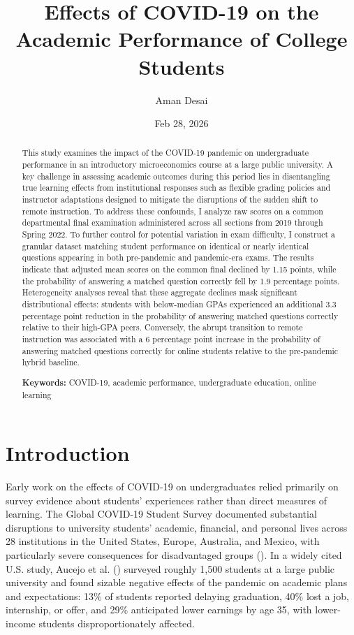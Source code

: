 \documentclass[
  12pt,
  letterpaper,
  DIV=11,
  numbers=noendperiod]{scrartcl}
\title{Effects of COVID-19 on the Academic Performance of College
Students}
\author{Aman Desai}
\date{Feb 28, 2026}
\begin{document}
\maketitle
\begin{abstract}
This study examines the impact of the COVID-19 pandemic on undergraduate
performance in an introductory microeconomics course at a large public
university. A key challenge in assessing academic outcomes during this
period lies in disentangling true learning effects from institutional
responses such as flexible grading policies and instructor adaptations
designed to mitigate the disruptions of the sudden shift to remote
instruction. To address these confounds, I analyze raw scores on a
common departmental final examination administered across all sections
from 2019 through Spring 2022. To further control for potential
variation in exam difficulty, I construct a granular dataset matching
student performance on identical or nearly identical questions appearing
in both pre-pandemic and pandemic-era exams. The results indicate that
adjusted mean scores on the common final declined by 1.15 points, while
the probability of answering a matched question correctly fell by 1.9
percentage points. Heterogeneity analyses reveal that these aggregate
declines mask significant distributional effects: students with
below-median GPAs experienced an additional 3.3 percentage point
reduction in the probability of answering matched questions correctly
relative to their high-GPA peers. Conversely, the abrupt transition to
remote instruction was associated with a 6 percentage point increase in
the probability of answering matched questions correctly for online
students relative to the pre-pandemic hybrid baseline.

\vspace{12pt}

\noindent \textbf{Keywords:} COVID-19, academic performance,
undergraduate education, online learning
\end{abstract}


\pagebreak

\section{Introduction}\label{introduction}

Early work on the effects of COVID-19 on undergraduates relied primarily
on survey evidence about students' experiences rather than direct
measures of learning. The Global COVID-19 Student Survey documented
substantial disruptions to university students' academic, financial, and
personal lives across 28 institutions in the United States, Europe,
Australia, and Mexico, with particularly severe consequences for
disadvantaged groups (). In a widely cited U.S. study, Aucejo et al.
() surveyed roughly 1,500
students at a large public university and found sizable negative effects
of the pandemic on academic plans and expectations: 13\% of students
reported delaying graduation, 40\% lost a job, internship, or offer, and
29\% anticipated lower earnings by age 35, with lower-income students
disproportionately affected.
\end{document}
